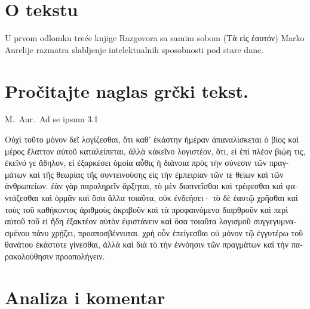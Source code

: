 \section*{O tekstu}

U prvom odlomku treće knjige Razgovora sa samim sobom \textgreek[variant=ancient]{(Tὰ εἰς ἑαυτόν)} Marko Aurelije razmatra slabljenje intelektualnih sposobnosti pod stare dane.

\section*{Pročitajte naglas grčki tekst.}

M.~Aur.\ Ad se ipsum 3.1


\medskip


{\large

\begin{greek}

\noindent Οὐχὶ τοῦτο μόνον δεῖ λογίζεσθαι, ὅτι καθ' ἑκάστην ἡμέραν ἀπαναλίσκεται ὁ βίος καὶ μέρος ἔλαττον αὐτοῦ καταλείπεται, ἀλλὰ κἀκεῖνο λογιστέον, ὅτι, εἰ ἐπὶ πλέον βιῴη τις, ἐκεῖνό γε ἄδηλον, εἰ ἐξαρκέσει ὁμοία αὖθις ἡ διάνοια πρὸς τὴν σύνεσιν τῶν πραγμάτων καὶ τῆς θεωρίας τῆς συντεινούσης εἰς τὴν ἐμπειρίαν τῶν τε θείων καὶ τῶν ἀνθρωπείων. ἐὰν γὰρ παραληρεῖν ἄρξηται, τὸ μὲν διαπνεῖσθαι καὶ τρέφεσθαι καὶ φαντάζεσθαι καὶ ὁρμᾶν καὶ ὅσα ἄλλα τοιαῦτα, οὐκ ἐνδεήσει· τὸ δὲ ἑαυτῷ χρῆσθαι καὶ τοὺς τοῦ καθήκοντος ἀριθμοὺς ἀκριβοῦν καὶ τὰ προφαινόμενα διαρθροῦν καὶ περὶ αὐτοῦ τοῦ εἰ ἤδη ἐξακτέον αὑτὸν ἐφιστάνειν καὶ ὅσα τοιαῦτα λογισμοῦ συγγεγυμνασμένου πάνυ χρῄζει, προαποσβέννυται. χρὴ οὖν ἐπείγεσθαι οὐ μόνον τῷ ἐγγυτέρω τοῦ θανάτου ἑκάστοτε γίνεσθαι, ἀλλὰ καὶ διὰ τὸ τὴν ἐννόησιν τῶν πραγμάτων καὶ τὴν παρακολούθησιν προαπολήγειν.


\end{greek}


}



\section*{Analiza i komentar}



